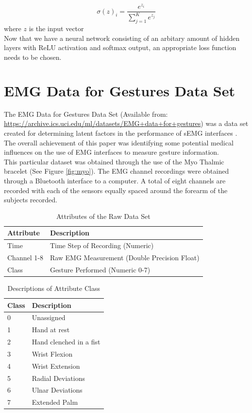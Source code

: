 \documentclass[11pt]{article}
\begin{document}
	$$\sigma(z)_i= \frac{e^{z_i}}{\sum_{j=1}^{K}e^{z_j}}$$ where $z$ is the input vector\\
	
	\noindent
	Now that we have a neural network consisting of an arbitary amount of hidden layers with ReLU activation and softmax output, an appropriate loss function needs to be chosen. 
	
	
	\section{EMG Data for Gestures Data Set}
	The EMG Data for Gestures Data Set (Available from: \url{https://archive.ics.uci.edu/ml/datasets/EMG+data+for+gestures}) was a data set created for determining latent factors in the performance of sEMG interfaces \cite{Lobov2018}. The overall achievement of this paper was identifying some potential medical influences on the use of EMG interfaces to measure gesture information.\\
	
	\noindent
	This particular dataset was obtained through the use of the Myo Thalmic bracelet (See Figure \ref{fig:myo}). The EMG channel recordings were obtained through a Bluetooth interface to a computer. A total of eight channels are recorded with each of the sensors equally spaced around the forearm of the subjects recorded.\\
	
	\begin{table}[H]
		\caption{Attributes of the Raw Data Set}
		\centering
		\begin{tabular}{l|l}
			Attribute   & Description             \\\hline
			Time        & Time Step of  Recording (Numeric)\\
			Channel 1-8 & Raw EMG Measurement (Double Precision Float)     \\
			Class       & Gesture Performed (Numeric 0-7)      \\\hline\hline
		\end{tabular}
	\end{table}

\begin{table}[H]
	\caption{Descriptions of Attribute Class}
	\centering
	\begin{tabular}{l|l}
		Class & Description             \\\hline
		0     & Unassigned              \\
		1     & Hand at rest            \\
		2     & Hand clenched in a fist \\
		3     & Wrist Flexion           \\
		4     & Wrist Extension         \\
		5     & Radial Deviations       \\
		6     & Ulnar Deviations        \\
		7     & Extended Palm           \\\hline\hline
	\end{tabular}
\end{table}
	
\end{document}
